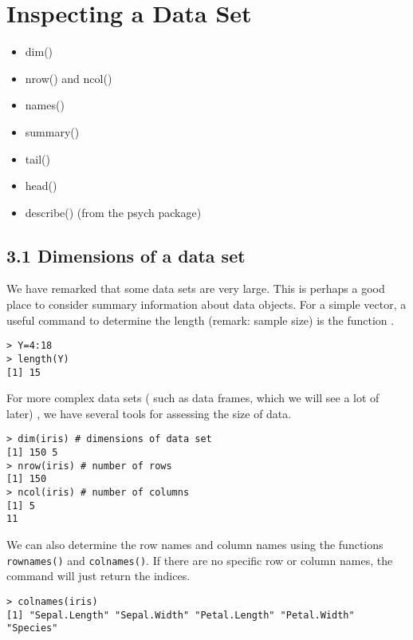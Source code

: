 
\section{Inspecting a Data Set}
\begin{itemize}
	\item dim()
	\item nrow() and ncol()
	\item names()
	\item summary()
	\item tail()
	\item head()
	\item describe() (from the psych package)
\end{itemize}
\subsection*{3.1 Dimensions of a data set}
We have remarked that some data sets are very large. This is perhaps a good place to consider
summary information about data objects. For a simple vector, a useful command to determine
the length (remark: sample size) is the function .
\begin{framed}
\begin{verbatim}
> Y=4:18
> length(Y)
[1] 15
\end{verbatim}
\end{framed}
For more complex data sets ( such as data frames,  which we will see a lot of later) , we have several
tools for assessing the size of data.
\begin{framed}
\begin{verbatim}
> dim(iris) # dimensions of data set
[1] 150 5
> nrow(iris) # number of rows
[1] 150
> ncol(iris) # number of columns
[1] 5
11

\end{verbatim}
\end{framed}

We can also determine the row names and column names using the functions \texttt{rownames()}
and \texttt{colnames()}. If there are no specific row or column names, the command will just return
the indices.
\begin{framed}
\begin{verbatim}
> colnames(iris)
[1] "Sepal.Length" "Sepal.Width" "Petal.Length" "Petal.Width" "Species"

\end{verbatim}
\end{framed}

